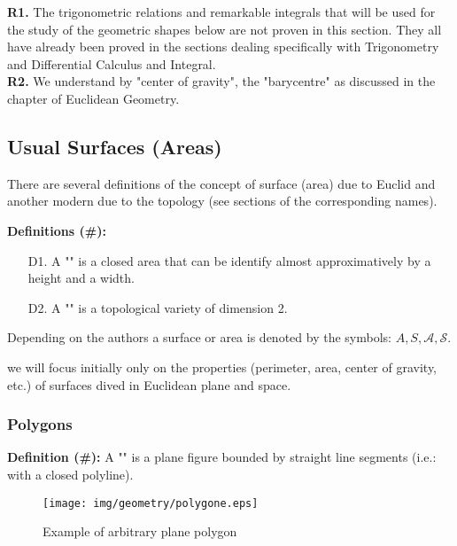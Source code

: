 {	\begin{tcolorbox}[title=Remarks,colframe=black,arc=10pt]
	\textbf{R1.} The trigonometric relations and remarkable integrals that will be used for the study of the geometric shapes below are not proven in this section. They all have already been proved in the sections dealing specifically with Trigonometry and Differential Calculus and Integral.\\
	
	\textbf{R2.} We understand by "center of gravity", the "barycentre" as discussed in the chapter of Euclidean Geometry.
	\end{tcolorbox}	
	
	\subsection{Usual Surfaces (Areas)}\label{known surfaces}
	There are several definitions of the concept of surface (area) due to Euclid and another modern due to the topology (see sections of the corresponding names).

\textbf{Definitions (\#\mydef):}
	\begin{enumerate}
		\item[D1.] A "" is a closed area that can be identify almost approximatively by a height and a width.
		\item[D2.] A "" is a topological variety of dimension 2.
	\end{enumerate}
	Depending on the authors a surface or area is denoted by the symbols: $A, S, \mathcal{A}, \mathcal{S}$.

	\begin{tcolorbox}[title=Remark,colframe=black,arc=10pt]
we will focus initially only on the properties (perimeter, area, center of gravity, etc.) of surfaces dived in Euclidean plane and space.
	\end{tcolorbox}	

	\subsubsection{Polygons}\label{polygon}
	\textbf{Definition (\#\mydef):} A "" is a plane figure bounded by straight line segments (i.e.: with a closed polyline).

\begin{figure}[H]
\centering
\texttt{[image: img/geometry/polygone.eps]}
\caption{Example of arbitrary plane polygon}
\end{figure}

}
